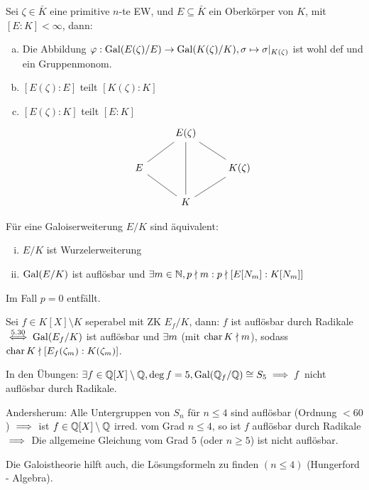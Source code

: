 \documentclass[a4paper]{report}
\begin{document}
\begin{bem}[Übung]
  Sei $\zeta \in \bar K$ eine primitive $n$-te EW, und $E \subseteq \bar K$ ein Oberkörper von $K$, mit $[E:K] < \infty$, dann:
  \begin{enumerate}[(a)]
    \item Die Abbildung $\varphi:\operatorname{Gal}(E(\zeta)/E) \to \operatorname{Gal}(K(\zeta)/K), \sigma \mapsto \sigma|_{K(\zeta)}$ ist wohl def und ein Gruppenmonom.
    \item $[E(\zeta):E]$ teilt $[K(\zeta):K]$
    \item $[E(\zeta):K]$ teilt $[E:K]$
          \[\begin{tikzcd}
                      & E(\zeta)                                                      &                              \\
E \arrow[ru, no head] &                                                               & K(\zeta) \arrow[lu, no head] \\
                      & K \arrow[ru, no head] \arrow[lu, no head] \arrow[uu, no head] &
\end{tikzcd}
          \]
  \end{enumerate}
\end{bem}

\begin{satz} Für eine Galoiserweiterung $E/K$ sind äquivalent:
  \begin{enumerate}[(i)]
    \item $E / K$ ist Wurzelerweiterung
          \item $\operatorname{Gal}(E/K)$ ist auflösbar und $\exists m \in \mathbb{N},  p \nmid m : p \nmid [E[N_{m}] : K[N_{m}]]$
  \end{enumerate}
  \begin{bem*}
Im Fall $p = 0$ entfällt.
  \end{bem*}
\end{satz}
\begin{kor}
  Sei $f \in K[X] \setminus K$ seperabel mit ZK $E_{f}/K$, dann: $f$ ist auflösbar durch Radikale $\overset{5.30}\iff \operatorname{Gal}(E_{f}/K)$ ist auflösbar und $\exists m$ (mit $\operatorname{char} K \nmid m$), sodass $\operatorname{char} K \nmid [E_{f}(\zeta_{m}) : K(\zeta_{m})]$.
  \item In den Übungen: $\exists f \in \mathbb{Q}[X] \setminus \mathbb{Q}, \deg f = 5, \operatorname{Gal}(\mathbb{Q}_{f}/\mathbb{Q}) \cong S_{5} \implies f$ nicht auflösbar durch Radikale.
  \item Andersherum: Alle Untergruppen von $S_{n}$ für $n \le 4$ sind auflösbar (Ordnung $<60$) $\implies$ ist $f \in \mathbb{Q}[X] \setminus \mathbb{Q}$ irred. vom Grad $n \le 4$, so ist $f$ auflösbar durch Radikale $\implies$ Die allgemeine Gleichung vom Grad $5$ (oder $n \ge 5$) ist nicht auflösbar.
\end{kor}
\begin{bem}
  Die Galoistheorie hilft auch, die Lösungsformeln zu finden $(n \le 4)$ (Hungerford - Algebra).
\end{bem}
\end{document}
